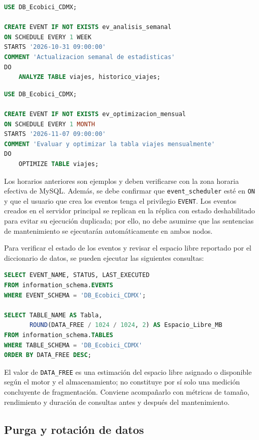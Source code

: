 \documentclass[10pt,a4paper]{article}
\begin{document}
\begin{lstlisting}[language=SQL, caption={Evento de mantenimiento semanal}]
USE DB_Ecobici_CDMX;

CREATE EVENT IF NOT EXISTS ev_analisis_semanal
ON SCHEDULE EVERY 1 WEEK
STARTS '2026-10-31 09:00:00'
COMMENT 'Actualizacion semanal de estadisticas'
DO
    ANALYZE TABLE viajes, historico_viajes;
\end{lstlisting}

\begin{lstlisting}[language=SQL, caption={Evento mensual de optimización}]
USE DB_Ecobici_CDMX;

CREATE EVENT IF NOT EXISTS ev_optimizacion_mensual
ON SCHEDULE EVERY 1 MONTH
STARTS '2026-11-07 09:00:00'
COMMENT 'Evaluar y optimizar la tabla viajes mensualmente'
DO
    OPTIMIZE TABLE viajes;
\end{lstlisting}

Los horarios anteriores son ejemplos y deben verificarse con la zona horaria efectiva de MySQL. Además, se debe confirmar que \texttt{event\_scheduler} esté en \texttt{ON} y que el usuario que crea los eventos tenga el privilegio \texttt{EVENT}. Los eventos creados en el servidor principal se replican en la réplica con estado deshabilitado para evitar su ejecución duplicada; por ello, no debe asumirse que las sentencias de mantenimiento se ejecutarán automáticamente en ambos nodos.

Para verificar el estado de los eventos y revisar el espacio libre reportado por el diccionario de datos, se pueden ejecutar las siguientes consultas:

\begin{lstlisting}[language=SQL, caption={Verificación de eventos y espacio libre}]
SELECT EVENT_NAME, STATUS, LAST_EXECUTED
FROM information_schema.EVENTS
WHERE EVENT_SCHEMA = 'DB_Ecobici_CDMX';

SELECT TABLE_NAME AS Tabla,
       ROUND(DATA_FREE / 1024 / 1024, 2) AS Espacio_Libre_MB
FROM information_schema.TABLES
WHERE TABLE_SCHEMA = 'DB_Ecobici_CDMX'
ORDER BY DATA_FREE DESC;
\end{lstlisting}

El valor de \texttt{DATA\_FREE} es una estimación del espacio libre asignado o disponible según el motor y el almacenamiento; no constituye por sí solo una medición concluyente de fragmentación. Conviene acompañarlo con métricas de tamaño, rendimiento y duración de consultas antes y después del mantenimiento.

\subsection{Purga y rotación de datos}
\end{document}
